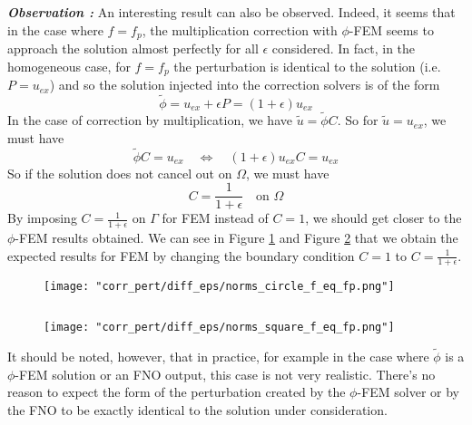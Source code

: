 \begin{enumerate}[label=\textbullet]
	\textbf{\textit{Observation :}} An interesting result can also be observed. Indeed, it seems that in the case where $f=f_p$, the multiplication correction with $\phi$-FEM seems to approach the solution almost perfectly for all $\epsilon$ considered.
	In fact, in the homogeneous case, for $f=f_p$ the perturbation is identical to the solution (i.e. $P=u_{ex}$) and so the solution injected into the correction solvers is of the form
	\begin{equation*}
		\tilde{\phi}=u_{ex}+\epsilon P=(1+\epsilon)u_{ex}
	\end{equation*}
	In the case of correction by multiplication, we have $\tilde{u}=\tilde{\phi}C$. So for $\tilde{u}=u_{ex}$, we must have
	\begin{equation*}
		\tilde{\phi}C=u_{ex} \quad \iff \quad (1+\epsilon)u_{ex}C=u_{ex}
	\end{equation*}
	So if the solution does not cancel out on $\Omega$, we must have
	\begin{equation*}
		C=\frac{1}{1+\epsilon} \quad \text{on } \Omega
	\end{equation*}
	By imposing $C=\frac{1}{1+\epsilon}$ on $\Gamma$ for FEM instead of $C=1$, we should get closer to the $\phi$-FEM results obtained. We can see in Figure \ref{norms_circle_f_eq_fp} and Figure \ref{norms_square_f_eq_fp} that we obtain the expected results for FEM by changing the boundary condition $C=1$ to $C=\frac{1}{1+\epsilon}$.
	
	\begin{minipage}{0.48\linewidth}
		\begin{figure}[H]
			\centering
			\texttt{[image: "corr\_pert/diff\_eps/norms\_circle\_f\_eq\_fp.png"]}
			\label{norms_circle_f_eq_fp}
		\end{figure} 
	\end{minipage} $\qquad$
	\begin{minipage}{0.48\linewidth}
		\begin{figure}[H]
			\centering
			\texttt{[image: "corr\_pert/diff\_eps/norms\_square\_f\_eq\_fp.png"]}
			\label{norms_square_f_eq_fp}
		\end{figure} 
	\end{minipage}
	\begin{Rem}
		It should be noted, however, that in practice, for example in the case where $\tilde{\phi}$ is a $\phi$-FEM solution or an FNO output, this case is not very realistic. There's no reason to expect the form of the perturbation created by the $\phi$-FEM solver or by the FNO to be exactly identical to the solution under consideration.
	\end{Rem}
	

\end{enumerate}
